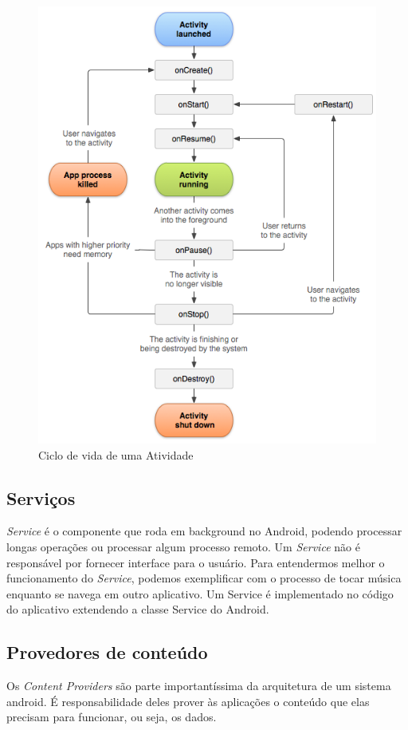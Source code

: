 \documentclass[12pt, %
openright, 
oneside,
a4paper,
brazil]{facom-ufu-abntex2}
\begin{document}
	\begin{figure}[hbt]
  		\includegraphics [scale=.7] {activity_lifecycle}
  		\caption{Ciclo de vida de uma Atividade \cite{docAndroid}}
	\end{figure}

	
	\subsection{Serviços}
	\emph{Service} é o componente que roda em background no Android, podendo processar longas operações ou processar algum processo remoto. Um \emph{Service} não é responsável por fornecer interface para o usuário. Para entendermos melhor o funcionamento do \emph{Service}, podemos exemplificar com o processo de tocar música enquanto se navega em outro aplicativo.
	Um Service é implementado no código do aplicativo extendendo a classe Service do Android.\cite{docAndroid}
	
	\subsection{Provedores de conteúdo}
	Os \emph{Content Providers} são parte importantíssima da arquitetura de um sistema android. É responsabilidade deles prover às aplicações o conteúdo que elas precisam para funcionar, ou seja, os dados.
\end{document}
